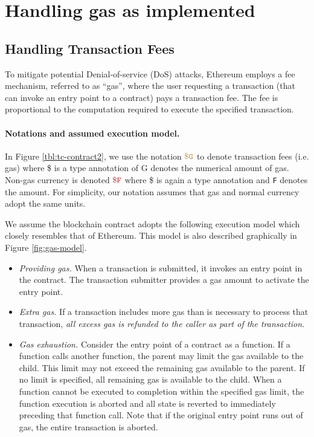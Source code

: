 
\section{Handling gas as implemented}


\subsection{Handling Transaction Fees}

To mitigate potential Denial-of-service (DoS) attacks, Ethereum employs a fee mechanism, referred to as ``gas'',
where the user requesting a transaction (that can invoke an entry point to a contract) pays a transaction fee.
The fee is proportional to the computation required to execute the specified transaction.


\paragraph{Notations and assumed execution model.}
In Figure \ref{tbl:tc-contract2}, we use the notation $\tt {\color{brown} \$G }$ to denote transaction fees (i.e. gas) where \$ is a type annotation of {\sf G} denotes the numerical amount of gas.
Non-gas currency is denoted $\fee$ where \$ is again a type annotation and {\tt F} denotes the amount.
For simplicity, our notation assumes that gas and normal currency adopt the same units.

We assume the blockchain contract adopts the following execution model which closely resembles that of Ethereum.
This model is also described graphically in Figure \ref{fig:gas-model}.

\begin{itemize}[leftmargin=1.5em]
  \item {\it Providing gas.}
    When a transaction is submitted, it invokes an entry point in the contract.
    The transaction submitter provides a gas amount to activate the entry point.

  \item {\it Extra gas.}
    If a transaction includes more gas than is necessary to process that transaction,
    \emph{all excess gas is refunded to the caller as part of the transaction}.

  \item {\it Gas exhaustion.}
    Consider the entry point of a contract as a function.
    If a function calls another function, the parent may limit the gas available to the child.
    This limit may not exceed the remaining gas available to the parent.
    If no limit is specified, all remaining gas is available to the child.
    When a function cannot be executed to completion within the specified gas limit,
    the function execution is aborted and all state is reverted to immediately preceding that function call.
    Note that if the original entry point runs out of gas, the entire transaction is aborted.

\end{itemize}


